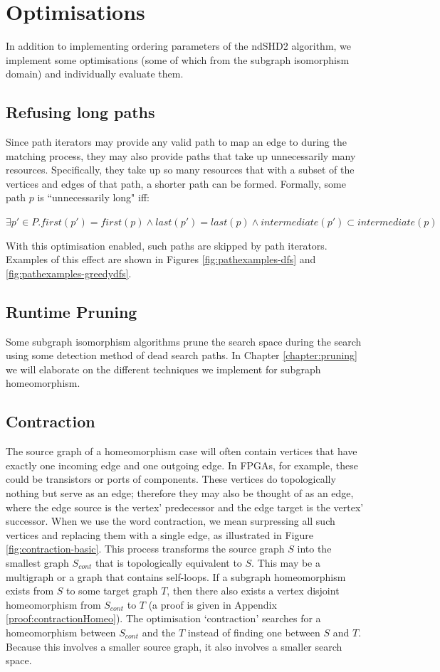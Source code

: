 \section{Optimisations}
In addition to implementing ordering parameters of the ndSHD2 algorithm, we implement some optimisations (some of which from the subgraph isomorphism domain) and individually evaluate them.

\subsection{Refusing long paths}
Since path iterators may provide any valid path to map an edge to during the matching process, they may also provide paths that take up unnecessarily many resources. Specifically, they take up so many resources that with a subset of the vertices and edges of that path, a shorter path can be formed. Formally, some path $p$ is ``unnecessarily long" iff:


$\exists p' \in P . first(p') = first(p) \land last(p') = last(p) \land intermediate(p') \subset intermediate(p)$

With this optimisation enabled, such paths are skipped by path iterators. Examples of this effect are shown in Figures \ref{fig:pathexamples-dfs} and \ref{fig:pathexamples-greedydfs}.

\subsection{Runtime Pruning}
Some subgraph isomorphism algorithms\cite{Cordella2004, McCreesh2015} prune the search space during the search using some detection method of dead search paths. In Chapter \ref{chapter:pruning} we will elaborate on the different techniques we implement for subgraph homeomorphism.

\subsection{Contraction}
The source graph of a homeomorphism case will often contain vertices that have exactly one incoming edge and one outgoing edge. In FPGAs, for example, these could be transistors or ports of components. These vertices do topologically nothing but serve as an edge; therefore they may also be thought of as an edge, where the edge source is the vertex' predecessor and the edge target is the vertex' successor. When we use the word contraction, we mean surpressing all such vertices and replacing them with a single edge, as illustrated in Figure \ref{fig:contraction-basic}. This process transforms the source graph $S$ into the smallest graph $S_{cont}$ that is topologically equivalent to $S$. This may be a multigraph or a graph that contains self-loops. If a subgraph homeomorphism exists from $S$ to some target graph $T$, then there also exists a vertex disjoint homeomorphism from $S_{cont}$ to $T$ (a proof is given in Appendix \ref{proof:contractionHomeo}). The optimisation `contraction' searches for a homeomorphism between $S_{cont}$ and the $T$ instead of finding one between $S$ and $T$. Because this involves a smaller source graph, it also involves a smaller search space.

